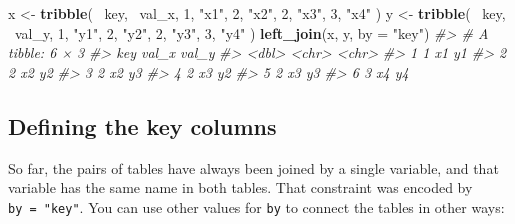 \documentclass[]{book}
\newenvironment{Shaded}{\begin{snugshade}}{\end{snugshade}}
\newcommand{\KeywordTok}[1]{\textcolor[rgb]{0.13,0.29,0.53}{\textbf{{#1}}}}
\newcommand{\DataTypeTok}[1]{\textcolor[rgb]{0.13,0.29,0.53}{{#1}}}
\newcommand{\DecValTok}[1]{\textcolor[rgb]{0.00,0.00,0.81}{{#1}}}
\newcommand{\StringTok}[1]{\textcolor[rgb]{0.31,0.60,0.02}{{#1}}}
\newcommand{\CommentTok}[1]{\textcolor[rgb]{0.56,0.35,0.01}{\textit{{#1}}}}
\newcommand{\NormalTok}[1]{{#1}}
\begin{document}
\begin{enumerate}
\begin{Shaded}
\begin{Highlighting}[]
\NormalTok{x <-}\StringTok{ }\KeywordTok{tribble}\NormalTok{(}
  \NormalTok{~key, ~val_x,}
     \DecValTok{1}\NormalTok{, }\StringTok{"x1"}\NormalTok{,}
     \DecValTok{2}\NormalTok{, }\StringTok{"x2"}\NormalTok{,}
     \DecValTok{2}\NormalTok{, }\StringTok{"x3"}\NormalTok{,}
     \DecValTok{3}\NormalTok{, }\StringTok{"x4"}
\NormalTok{)}
\NormalTok{y <-}\StringTok{ }\KeywordTok{tribble}\NormalTok{(}
  \NormalTok{~key, ~val_y,}
     \DecValTok{1}\NormalTok{, }\StringTok{"y1"}\NormalTok{,}
     \DecValTok{2}\NormalTok{, }\StringTok{"y2"}\NormalTok{,}
     \DecValTok{2}\NormalTok{, }\StringTok{"y3"}\NormalTok{,}
     \DecValTok{3}\NormalTok{, }\StringTok{"y4"}
\NormalTok{)}
\KeywordTok{left_join}\NormalTok{(x, y, }\DataTypeTok{by =} \StringTok{"key"}\NormalTok{)}
\CommentTok{#> # A tibble: 6 × 3}
\CommentTok{#>     key val_x val_y}
\CommentTok{#>   <dbl> <chr> <chr>}
\CommentTok{#> 1     1    x1    y1}
\CommentTok{#> 2     2    x2    y2}
\CommentTok{#> 3     2    x2    y3}
\CommentTok{#> 4     2    x3    y2}
\CommentTok{#> 5     2    x3    y3}
\CommentTok{#> 6     3    x4    y4}
\end{Highlighting}
\end{Shaded}
\end{enumerate}

\subsection{Defining the key columns}\label{join-by}

So far, the pairs of tables have always been joined by a single
variable, and that variable has the same name in both tables. That
constraint was encoded by \texttt{by\ =\ "key"}. You can use other
values for \texttt{by} to connect the tables in other ways:
\end{document}
